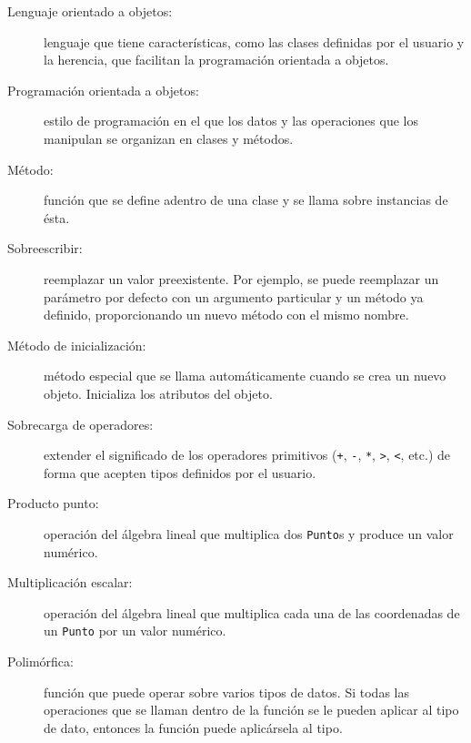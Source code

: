 \begin{description}

\item[Lenguaje orientado a objetos:] lenguaje que tiene 
características,  como las clases definidas por el usuario y la herencia,
que facilitan la programación orientada a objetos.

\item[Programación orientada a objetos:]  estilo de programación en 
el que los datos y las operaciones que los manipulan se organizan en 
clases y métodos.

\item[Método:] función que se define adentro de una clase y se 
llama sobre instancias de ésta.

\item[Sobreescribir:] reemplazar un valor preexistente.  Por ejemplo, se
puede reemplazar un parámetro por defecto con un argumento particular y 
un método ya definido, proporcionando un nuevo método con el mismo nombre.

\item[Método de inicialización:] método especial que se llama automáticamente
cuando se crea un nuevo objeto. Inicializa los atributos del objeto.

\item[Sobrecarga de operadores:] extender el significado de los operadores
primitivos  (\texttt{+}, \texttt{-}, \texttt{*}, \texttt{>}, \texttt{<}, etc.) de
forma que acepten tipos definidos por el usuario.

\item[Producto punto:] operación del álgebra lineal que multiplica dos
 \texttt{Punto}s y produce un valor numérico.

\item[Multiplicación escalar:] operación del álgebra lineal que multiplica
cada una de las coordenadas de un  \texttt{Punto} por un valor numérico.

\item[Polimórfica:] función que puede operar sobre varios tipos de datos.
Si todas las operaciones que se llaman dentro de la función se le pueden 
aplicar al tipo de dato, entonces la función puede aplicársela al tipo.



\end{description}

